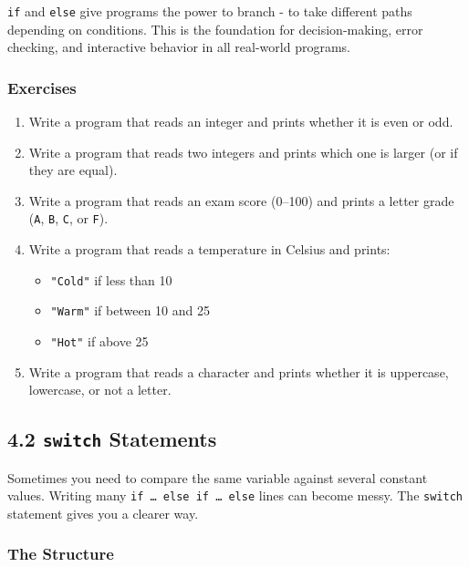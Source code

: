 \documentclass[
  letterpaper,
  DIV=11,
  numbers=noendperiod]{scrreprt}
\providecommand{\tightlist}{%
  \setlength{\itemsep}{0pt}\setlength{\parskip}{0pt}}
\begin{document}
\texttt{if} and \texttt{else} give programs the power to branch - to
take different paths depending on conditions. This is the foundation for
decision-making, error checking, and interactive behavior in all
real-world programs.

\subsubsection{Exercises}\label{exercises-15}

\begin{enumerate}
\def\labelenumi{\arabic{enumi}.}
\item
  Write a program that reads an integer and prints whether it is even or
  odd.
\item
  Write a program that reads two integers and prints which one is larger
  (or if they are equal).
\item
  Write a program that reads an exam score (0--100) and prints a letter
  grade (\texttt{A}, \texttt{B}, \texttt{C}, or \texttt{F}).
\item
  Write a program that reads a temperature in Celsius and prints:

  \begin{itemize}
  \tightlist
  \item
    \texttt{"Cold"} if less than 10
  \item
    \texttt{"Warm"} if between 10 and 25
  \item
    \texttt{"Hot"} if above 25
  \end{itemize}
\item
  Write a program that reads a character and prints whether it is
  uppercase, lowercase, or not a letter.
\end{enumerate}

\subsection{\texorpdfstring{4.2 \texttt{switch}
Statements}{4.2 switch Statements}}\label{switch-statements}

Sometimes you need to compare the same variable against several constant
values. Writing many \texttt{if\ …\ else\ if\ …\ else} lines can become
messy. The \texttt{switch} statement gives you a clearer way.

\subsubsection{The Structure}\label{the-structure}
\end{document}
